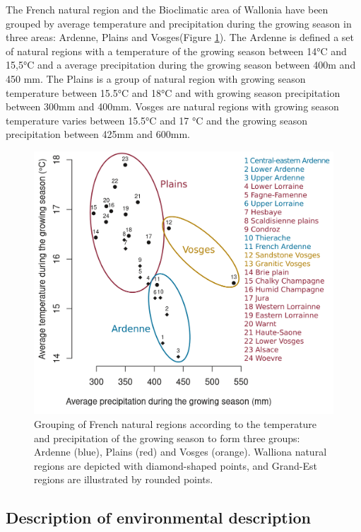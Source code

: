 \documentclass[3p,procedia]{elsarticle}
\begin{document}
The French natural region and the Bioclimatic area of Wallonia have been grouped by average temperature and precipitation during the growing season  in three areas: Ardenne, Plains and Vosges(Figure \ref{fig:clim}).
The Ardenne is defined a set of natural regions with a temperature of the growing season between 14°C and 15,5°C and a average precipitation during the growing season between 400m and 450 mm.
The Plains is a group of natural region with growing season temperature between 15.5°C and 18°C and with growing season  precipitation between 300mm and 400mm.
Vosges are natural regions with growing season temperature varies between 15.5°C and 17 °C and the growing season precipitation between 425mm and 600mm.


 

\begin{figure}
	\centering
\includegraphics[width=0.8\linewidth]{climat/climat_region.png}
\caption{Grouping of French natural regions according to the temperature and precipitation of the growing season to form three groups: Ardenne (blue), Plains (red) and Vosges (orange). Walliona natural regions are depicted with diamond-shaped points, and Grand-Est regions are illustrated by rounded points.}
	\label{fig:clim}
\end{figure}







\subsection{Description of environmental description}
\end{document}
